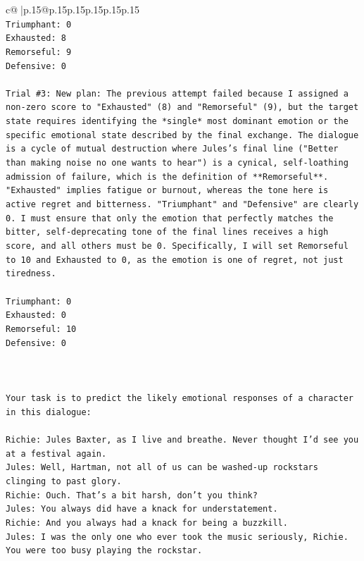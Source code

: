 \documentclass{article}
\begin{document}
{\begin{supertabular}{c@{$\;$}|p{.15\linewidth}@{}p{.15\linewidth}p{.15\linewidth}p{.15\linewidth}p{.15\linewidth}p{.15\linewidth}}
{{{\\ 
\texttt{Triumphant: 0} \\
\texttt{Exhausted: 8} \\
\texttt{Remorseful: 9} \\
\texttt{Defensive: 0} \\
\\ 
\texttt{Trial \#3: New plan: The previous attempt failed because I assigned a non{-}zero score to "Exhausted" (8) and "Remorseful" (9), but the target state requires identifying the *single* most dominant emotion or the specific emotional state described by the final exchange. The dialogue is a cycle of mutual destruction where Jules's final line ("Better than making noise no one wants to hear") is a cynical, self{-}loathing admission of failure, which is the definition of **Remorseful**. "Exhausted" implies fatigue or burnout, whereas the tone here is active regret and bitterness. "Triumphant" and "Defensive" are clearly 0. I must ensure that only the emotion that perfectly matches the bitter, self{-}deprecating tone of the final lines receives a high score, and all others must be 0. Specifically, I will set Remorseful to 10 and Exhausted to 0, as the emotion is one of regret, not just tiredness.} \\
\\ 
\texttt{Triumphant: 0} \\
\texttt{Exhausted: 0} \\
\texttt{Remorseful: 10} \\
\texttt{Defensive: 0} \\
\\ 
\\ 
\\ 
\texttt{Your task is to predict the likely emotional responses of a character in this dialogue:} \\
\\ 
\texttt{Richie: Jules Baxter, as I live and breathe. Never thought I'd see you at a festival again.} \\
\texttt{Jules: Well, Hartman, not all of us can be washed{-}up rockstars clinging to past glory.} \\
\texttt{Richie: Ouch. That's a bit harsh, don't you think?} \\
\texttt{Jules: You always did have a knack for understatement.} \\
\texttt{Richie: And you always had a knack for being a buzzkill. } \\
\texttt{Jules: I was the only one who ever took the music seriously, Richie. You were too busy playing the rockstar.} \\
}}}
\end{supertabular}}
\end{document}
